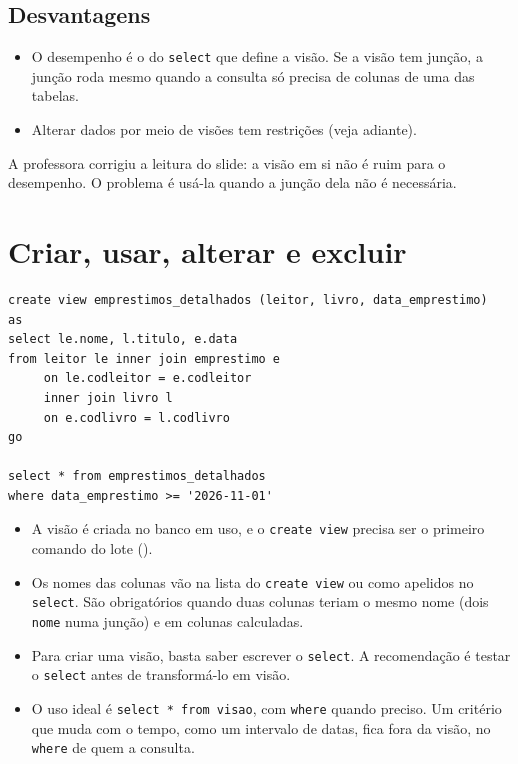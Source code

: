 \subsection{Desvantagens}

\begin{itemize}
	\item O desempenho é o do \texttt{select} que define a visão. Se a
	visão tem junção, a junção roda mesmo quando a consulta só precisa de
	colunas de uma das tabelas.
	\item Alterar dados por meio de visões tem restrições (veja adiante).
\end{itemize}

A professora corrigiu a leitura do slide: a visão em si não é ruim para
o desempenho. O problema é usá-la quando a junção dela não é necessária.

\section{Criar, usar, alterar e excluir}

\begin{lstlisting}[caption={Visão sobre o banco de biblioteca.}]
create view emprestimos_detalhados (leitor, livro, data_emprestimo)
as
select le.nome, l.titulo, e.data
from leitor le inner join emprestimo e
     on le.codleitor = e.codleitor
     inner join livro l
     on e.codlivro = l.codlivro
go

select * from emprestimos_detalhados
where data_emprestimo >= '2026-11-01'
\end{lstlisting}

\begin{itemize}
	\item A visão é criada no banco em uso, e o \texttt{create view} precisa
	ser o primeiro comando do lote ().
	\item Os nomes das colunas vão na lista do \texttt{create view} ou como
	apelidos no \texttt{select}. São obrigatórios quando duas colunas
	teriam o mesmo nome (dois \texttt{nome} numa junção) e em colunas
	calculadas.
	\item Para criar uma visão, basta saber escrever o \texttt{select}. A
	recomendação é testar o \texttt{select} antes de transformá-lo em
	visão.
	\item O uso ideal é \texttt{select * from visao}, com \texttt{where}
	quando preciso. Um critério que muda com o tempo, como um intervalo de
	datas, fica fora da visão, no \texttt{where} de quem a consulta.
\end{itemize}

